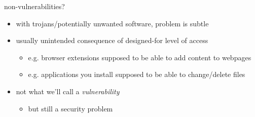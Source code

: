 \begin{frame}{non-vulnerabilities?}
    \begin{itemize}
    \item with trojans/potentially unwanted software, problem is subtle
    \vspace{.5cm}
    \item usually unintended consequence of designed-for level of access
        \begin{itemize}
        \item e.g. browser extensions supposed to be able to add content to webpages
        \item e.g. applications you install supposed to be able to change/delete files
        \end{itemize}
    \item not what we'll call a \textit{vulnerability}
        \begin{itemize}
        \item but still a security problem
        \end{itemize}
    \end{itemize}
\end{frame}
